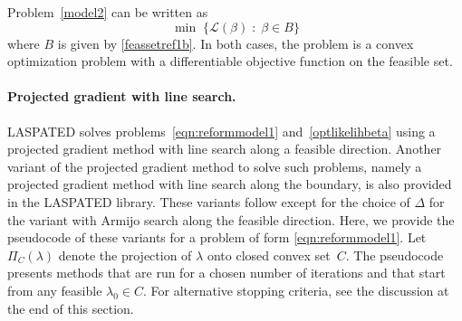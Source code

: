\documentclass[article]{jss}
\begin{document}
Problem~\eqref{model2} can be written as
\begin{equation}
\label{optlikelihbeta}
\min \; \{\mathscr{L}(\beta) \; : \; \beta \in B\}
\end{equation}
where $B$ is given by \eqref{feassetref1b}.
In both cases, the problem is a convex optimization problem with a differentiable objective function on the feasible set.


\paragraph{Projected gradient with line search.}
LASPATED solves problems~\eqref{eqn:reformmodel1} and~\eqref{optlikelihbeta} using a projected gradient method with line search along a feasible direction.
Another variant of the projected gradient method to solve such problems, namely a projected gradient method with line search along the boundary, is also provided in the LASPATED library.
These variants follow \cite{iusem2003} except for the choice of $\Delta$ for the variant with Armijo search along the feasible direction.
\fi
Here, we provide the pseudocode of these variants for a problem of form \eqref{eqn:reformmodel1}.
Let $\Pi_{C}(\lambda)$ denote the projection of $\lambda$ onto closed convex set~$C$.
The pseudocode presents methods that are run for a chosen number of iterations
and that start from any feasible $\lambda_{0} \in C$.
For alternative stopping criteria, see the discussion at the end of this section. \\
\end{document}
